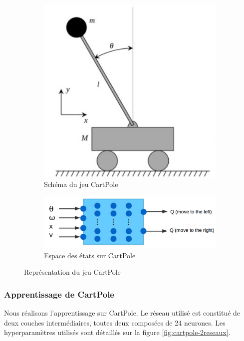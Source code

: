 \begin{figure}[h]
\centering
\begin{subfigure}{.3\textwidth}
  \centering
  \includegraphics[width=.9\linewidth]{img/schema_cartpole.png}
  \caption{Schéma du jeu CartPole}
  \label{fig:schema-cartpole}
\end{subfigure}%
\begin{subfigure}{.6\textwidth}
  \centering
  \includegraphics[width=.9\linewidth]{img/schema_cartpole_network.png}
  \caption{Espace des états sur CartPole}
  \label{fig:schema-cartpole-network}
\end{subfigure}
\caption{Représentation du jeu CartPole}
\label{fig:cartpole}
\end{figure}

\subsubsection{Apprentissage de CartPole}

Nous réalisons l'apprentissage sur CartPole. Le réseau utilisé est constitué de deux couches intermédiaires, toutes deux composées de 24 neurones. Les hyperparamètres
utilisés sont détaillés sur la figure \ref{fig:cartpole-2reseaux}.

